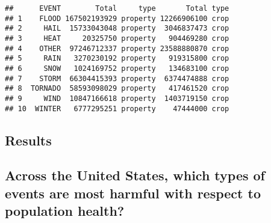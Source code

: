 \documentclass[
]{article}
\newenvironment{Shaded}{\begin{snugshade}}{\end{snugshade}}
\newcommand{\CommentTok}[1]{\textcolor[rgb]{0.56,0.35,0.01}{\textit{#1}}}
\newcommand{\DataTypeTok}[1]{\textcolor[rgb]{0.13,0.29,0.53}{#1}}
\newcommand{\FloatTok}[1]{\textcolor[rgb]{0.00,0.00,0.81}{#1}}
\newcommand{\KeywordTok}[1]{\textcolor[rgb]{0.13,0.29,0.53}{\textbf{#1}}}
\newcommand{\NormalTok}[1]{#1}
\newcommand{\OperatorTok}[1]{\textcolor[rgb]{0.81,0.36,0.00}{\textbf{#1}}}
\newcommand{\StringTok}[1]{\textcolor[rgb]{0.31,0.60,0.02}{#1}}
\begin{document}
\begin{verbatim}
##      EVENT        Total     type       Total type
## 1    FLOOD 167502193929 property 12266906100 crop
## 2     HAIL  15733043048 property  3046837473 crop
## 3     HEAT     20325750 property   904469280 crop
## 4    OTHER  97246712337 property 23588880870 crop
## 5     RAIN   3270230192 property   919315800 crop
## 6     SNOW   1024169752 property   134683100 crop
## 7    STORM  66304415393 property  6374474888 crop
## 8  TORNADO  58593098029 property   417461520 crop
## 9     WIND  10847166618 property  1403719150 crop
## 10  WINTER   6777295251 property    47444000 crop
\end{verbatim}

\hypertarget{results}{%
\subsection{Results}\label{results}}

\hypertarget{across-the-united-states-which-types-of-events-are-most-harmful-with-respect-to-population-health}{%
\subsection{Across the United States, which types of events are most
harmful with respect to population
health?}\label{across-the-united-states-which-types-of-events-are-most-harmful-with-respect-to-population-health}}

\begin{Shaded}
\end{Shaded}
\end{document}
